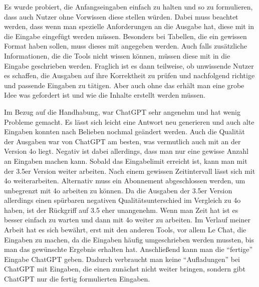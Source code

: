 Es wurde probiert, die Anfangseingaben einfach zu halten und so zu formulieren, dass auch Nutzer ohne Vorwissen 
diese stellen würden. Dabei muss beachtet werden, dass wenn man spezielle Anforderungen an die Ausgabe hat, 
diese mit in die Eingabe eingefügt werden müssen. Besonders bei Tabellen, die ein gewissen Format haben sollen, 
muss dieses mit angegeben werden. Auch falls zusätzliche Informationen, die die Tools nicht wissen können,
müssen diese mit in die Eingabe geschrieben werden. Fraglich ist es dann teilweise, ob unwissende Nutzer es 
schaffen, die Ausgaben auf ihre Korrektheit zu prüfen und nachfolgend richtige und passende Eingaben zu tätigen.
Aber auch ohne das erhält man eine grobe Idee was gefordert ist und wie die Inhalte erstellt werden müssen. 

Im Bezug auf die Handhabung, war ChatGPT sehr angenehm und hat wenig Probleme gemacht. Es lässt sich leicht 
eine Antwort neu generieren und auch alte Eingaben konnten nach Belieben nochmal geändert werden. Auch die 
Qualität der Ausgaben war von ChatGPT am besten, was vermutlich auch mit an der Version 4o liegt. Negativ ist 
dabei allerdings, dass man nur eine gewisse Anzahl an Eingaben machen kann. Sobald das Eingabelimit erreicht ist, kann 
man mit der 3.5er Version weiter arbeiten. Nach einem gewissen Zeitintervall lässt sich mit 4o weiterarbeiten. Alternativ 
muss ein Abonnement abgeschlossen werden, um unbegrenzt mit 4o arbeiten zu können. Da die Ausgaben der 3.5er Version allerdings einen spürbaren 
negativen Qualitätsunterschied im Vergleich zu 4o haben, ist der Rückgriff auf 3.5 eher unangenehm. Wenn man Zeit hat ist es besser 
einfach zu warten und dann mit 4o weiter zu arbeiten. Im Verlauf meiner Arbeit hat es sich bewährt, erst mit 
den anderen Tools, vor allem Le Chat, die Eingaben zu machen, da die Eingaben häufig umgeschrieben werden mussten, bis man
das gewünschte Ergebnis erhalten hat. Anschließend kann man die ``fertige'' Eingabe ChatGPT geben. Dadurch verbraucht man 
keine ``Aufladungen'' bei ChatGPT mit Eingaben, die einen zunächst nicht weiter bringen, sondern gibt ChatGPT nur die 
fertig formulierten Eingaben.

